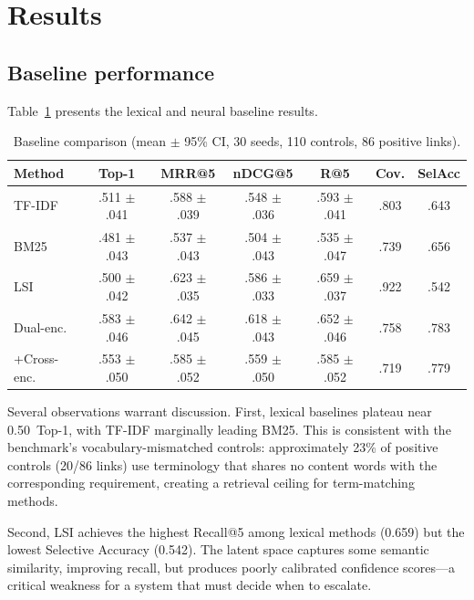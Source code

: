 \documentclass[a4paper,fleqn]{cas-sc}
\begin{document}
\section{Results}
\label{sec:results}

\subsection{Baseline performance}

Table~\ref{tab:baselines} presents the lexical and neural baseline results.

\begin{table}[t]
\caption{Baseline comparison (mean $\pm$ 95\% CI, 30 seeds, 110 controls, 86 positive links).}
\label{tab:baselines}
\centering
\small
\begin{tabular}{@{}lcccccc@{}}
\toprule
Method & Top-1 & MRR@5 & nDCG@5 & R@5 & Cov. & SelAcc \\
\midrule
TF-IDF        & .511 $\pm$ .041 & .588 $\pm$ .039 & .548 $\pm$ .036 & .593 $\pm$ .041 & .803 & .643 \\
BM25          & .481 $\pm$ .043 & .537 $\pm$ .043 & .504 $\pm$ .043 & .535 $\pm$ .047 & .739 & .656 \\
LSI~\citep{MarcusMaletic2003} & .500 $\pm$ .042 & .623 $\pm$ .035 & .586 $\pm$ .033 & .659 $\pm$ .037 & .922 & .542 \\
\midrule
Dual-enc.~\citep{Reimers2019} & .583 $\pm$ .046 & .642 $\pm$ .045 & .618 $\pm$ .043 & .652 $\pm$ .046 & .758 & .783 \\
+Cross-enc.   & .553 $\pm$ .050 & .585 $\pm$ .052 & .559 $\pm$ .050 & .585 $\pm$ .052 & .719 & .779 \\
\bottomrule
\end{tabular}
\end{table}

Several observations warrant discussion.
First, lexical baselines plateau near 0.50~Top-1, with TF-IDF marginally leading BM25.
This is consistent with the benchmark's vocabulary-mismatched controls: approximately 23\% of positive controls (20/86 links) use terminology that shares no content words with the corresponding requirement, creating a retrieval ceiling for term-matching methods.

Second, LSI achieves the highest Recall@5 among lexical methods (0.659) but the lowest Selective Accuracy (0.542).
The latent space captures some semantic similarity, improving recall, but produces poorly calibrated confidence scores---a critical weakness for a system that must decide when to escalate.
\end{document}
